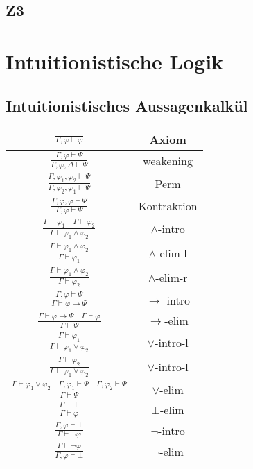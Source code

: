 \documentclass{scrartcl}
\begin{document}
\subsection{Z3}

\pagebreak
\section{Intuitionistische Logik}

\subsection{Intuitionistisches Aussagenkalkül}

\Huge
\begin{longtable}{|c|c|} 
	\hline
	$ \frac{}{\Gamma, \varphi \vdash \varphi} $ & Axiom \\
	\hline 
	$ \frac{\Gamma, \varphi \vdash \varPsi}{\Gamma, \varphi, \Delta \vdash \varPsi} $ & weakening \\ 
	\hline 
	$ \frac{\Gamma, \varphi_1, \varphi_2 \vdash \varPsi}{\Gamma, \varphi_2, \varphi_1 \vdash \varPsi} $ & Perm \\ 
	\hline 
	$ \frac{\Gamma, \varphi, \varphi \vdash \varPsi}{\Gamma, \varphi \vdash \varPsi} $ & Kontraktion \\ 
	\hline 
	$ \frac{\Gamma \vdash \varphi_1 \quad \Gamma \vdash \varphi_2}{\Gamma \vdash \varphi_1 \wedge \varphi_2} $ & $ \wedge $-intro \\
	\hline
	$ \frac{\Gamma \vdash \varphi_1 \wedge \varphi_2}{\Gamma \vdash \varphi_1} $ & $ \wedge $-elim-l \\
	\hline
	$ \frac{\Gamma \vdash \varphi_1 \wedge \varphi_2}{\Gamma \vdash \varphi_2} $ & $ \wedge $-elim-r \\
	\hline
	$ \frac{\Gamma, \varphi \vdash \varPsi}{\Gamma \vdash \varphi \rightarrow \varPsi} $ & $ \rightarrow $-intro \\
	\hline
	$ \frac{\Gamma \vdash \varphi \rightarrow \varPsi \quad \Gamma \vdash \varphi}{\Gamma \vdash \varPsi} $ & $ \rightarrow $-elim \\
	\hline
	$ \frac{\Gamma \vdash \varphi_1}{\Gamma \vdash \varphi_1 \vee \varphi_2} $ & $ \vee $-intro-l \\
	\hline
	$ \frac{\Gamma \vdash \varphi_2}{\Gamma \vdash \varphi_1 \vee \varphi_2} $ & $ \vee $-intro-l \\
	\hline
	$ \frac{\Gamma \vdash \varphi_1 \vee \varphi_2 \quad \Gamma, \varphi_1 \vdash \varPsi \quad \Gamma, \varphi_2 \vdash \varPsi}{\Gamma \vdash \varPsi} $ & $ \vee $-elim \\
	\hline
	$ \frac{\Gamma \vdash \bot}{\Gamma \vdash \varphi} $ & $ \bot $-elim \\
	\hline
	$ \frac{\Gamma, \varphi \vdash \bot}{\Gamma \vdash \neg \varphi} $ & $ \neg $-intro \\
	\hline
	$ \frac{\Gamma \vdash \neg \varphi}{\Gamma, \varphi \vdash \bot} $ & $ \neg $-elim \\
	\hline
\end{longtable}
\end{document}
